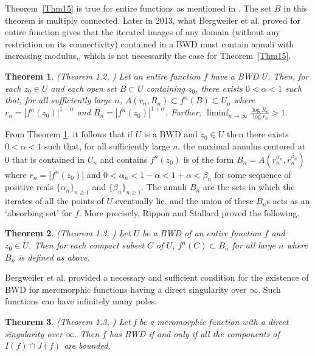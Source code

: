 \documentclass[11pt,a4paper]{article}
\newtheorem{theorem}{Theorem}[section]
\begin{document}
	Theorem~\ref{Thm15} is true for entire functions as mentioned in \cite{BergRippStall 2013}. The set $B$ in this theorem is multiply connected.  
	Later in 2013, what Bergweiler et al. \cite{BergRippStall 2013} proved for entire function gives that the iterated images of any domain (without any restriction on its connectivity)  contained in a BWD must contain annuli with increasing modulus,, which is not necessarily the case for Theorem~\ref{Thm15}. 
	\begin{theorem}(Theorem 1.2, \cite{BergRippStall 2013}\label{increasing-annulus})
		Let  an entire function $f$ have  a BWD $U$. Then, for each $z_0\in U$ and each open set $B\subset U$ containing $z_0$, there exists $0<\alpha<1$ such that, for all sufficiently large $n$, 
		$A(r_n, R_n)\subset f^n(B)\subset U_n $ 
		where $r_n=|f^n(z_0)|^{1-\alpha}$ and $R_n=|f^n(z_0)|^{1+\alpha}$. Further,  $\liminf_{n\to\infty}\frac{\log R_n}{\log r_n}>1$. 
	\end{theorem}
 
  From Theorem \ref{increasing-annulus}, it follows that if $U$ is a BWD and $z_0\in U$ then there exists $0<\alpha<1$ such that, for all sufficiently large $n $, the maximal annulus centered at $0$ that is contained in $U_n$ and contains $f^n(z_0)$ is of the form $B_n=A(r^{\alpha_n}_n, r^{\beta_n}_n)$ where $r_n=|f^n(z_0)|$ and $0<\alpha_n<1-\alpha<1+\alpha<\beta_n$ for some sequence of positive reals $\{\alpha_n\}_{n\geq 1}$ and $\{\beta_n\}_{n\geq 1}$. The annuli $B_n$ are the sets in which the iterates of all the points of $U$ eventually lie, and the union of these $B_n$s acts as an `absorbing set' for $f$. More precisely,  Rippon and Stallard proved the following.
	\begin{theorem}(Theorem 1.3, \cite{BergRippStall 2013}\label{Thm 2.14})
			Let $U$ be a BWD of an entire function $f$ and $z_0\in U$. Then for each compact subset $C$ of $U$, $f^n(C)\subset B_n$ for all large $n$ where $B_n$ is defined as above. 
	\end{theorem}
		\par Bergweiler et al. provided a necessary and sufficient condition for the existence of BWD for meromorphic functions having  a direct singularity over $\infty$. Such functions can have infinitely many
	poles.
	\begin{theorem}{(Theorem 1.3, \cite{BergRippStall 2008})}
		Let f be a meromorphic function with a direct singularity over $\infty$. Then $f$ has BWD if and only if all the components of $I(f)\cap J(f)$ are bounded.
	\end{theorem}	
	
\end{document}

